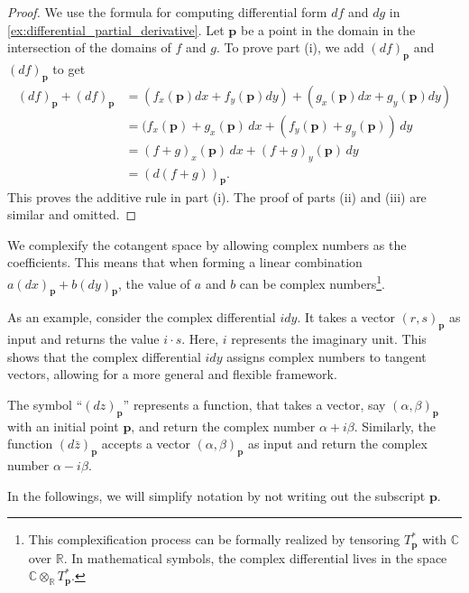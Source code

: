 \begin{proof}
We use the formula for computing differential form $df$ and $dg$ in \eqref{ex:differential_partial_derivative}. Let $\mathbf{p}$ be a point in the domain in the intersection of the domains of $f$ and $g$. To prove part (i), we add $(df)_{\mathbf{p}}$ and $(df)_{\mathbf{p}}$ to get
\begin{align*}
(df)_{\mathbf{p}} + (df)_{\mathbf{p}} & = 
(f_x(\mathbf{p}) dx + f_y(\mathbf{p}) dy ) + 
(g_x(\mathbf{p}) dx + g_y(\mathbf{p}) dy ) \\
& = (f_x(\mathbf{p}) + g_x(\mathbf{p}) \, dx + 
(f_y(\mathbf{p})  + g_y(\mathbf{p}) ) \, dy  \\
& =  (f+g)_x(\mathbf{p}) \,  dx + 
(f+g)_y(\mathbf{p}) \,  dy  \\
& = (d(f+g))_\mathbf{p}.
\end{align*}
This proves the additive rule in part (i). The proof of parts (ii) and (iii) are similar and omitted.
\end{proof}

We complexify the cotangent space by allowing complex numbers as the coefficients. This means that when forming a linear  combination $a (dx)_\mathbf{p}  + b (dy)_\mathbf{p}$, the value of $a$ and $b$ can be complex numbers\footnote{This complexification process can be formally realized by tensoring $T_\mathbf{p}^*$ with $\mathbb{C}$ over $\mathbb{R}$. In mathematical symbols, the complex differential lives in the space $\mathbb{C} \otimes_\mathbb{R} T_\mathbf{p}^*$.}.

As an example, consider the complex differential $idy$. It takes a vector $(r,s)_\mathbf{p}$ as input and returns the value $i \cdot s$. Here, $i$ represents the imaginary unit. This shows that the complex differential $idy$ assigns complex numbers to tangent vectors, allowing for a more general and flexible framework.






The symbol ``$(dz)_\mathbf{p}$'' represents a function, that takes a vector, say $(\alpha, \beta)_\mathbf{p}$ with an initial point $\mathbf{p}$, and return the complex number $\alpha+i\beta$. Similarly, the function $(d\bar{z})_\mathbf{p}$ accepts a vector $(\alpha,\beta)_\mathbf{p}$ as input and return the complex number $\alpha - i\beta$.

In the followings, we will simplify notation by not writing out the subscript $\mathbf{p}$.

